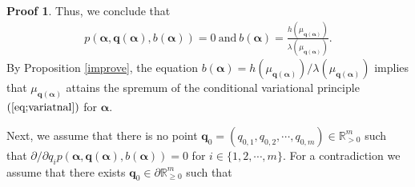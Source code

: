\documentclass{article}
\theoremstyle{definition}
\newtheorem*{pf}{Proof}
\begin{document}
\begin{pf}
Thus, we conclude that 
\begin{align}\label{eq:attain measure}
p(\boldsymbol{\alpha},\boldsymbol{q}(\boldsymbol{\alpha}),b(\boldsymbol{\alpha}))=0\ \text{and}\  b(\boldsymbol{\alpha})=\frac{h(\mu_{\boldsymbol{q}(\boldsymbol{\alpha})})}{\lambda(\mu_{\boldsymbol{q}(\boldsymbol{\alpha})})}.
\end{align}
By Proposition \ref{improve}, the equation $b(\boldsymbol{\alpha})={h(\mu_{\boldsymbol{q}(\boldsymbol{\alpha})})}/{\lambda(\mu_{\boldsymbol{q}(\boldsymbol{\alpha})})}$ implies that $\mu_{\boldsymbol{q}(\boldsymbol{\alpha})}$ attains the spremum of the conditional variational principle $(\ref{eq;variatnal})$ for $\boldsymbol{\alpha}$.

Next, we assume that there is no point $\boldsymbol{q}_0=(q_{0,1},q_{0,2},\cdots,q_{0,m}) \in \mathbb{R}^m_{>0}$ such that
     ${\partial}/{\partial q_i}p(\boldsymbol{\alpha},\boldsymbol{q}(\boldsymbol{\alpha}),b(\boldsymbol{\alpha}))=0$
for $i\in\lbrace1,2,\cdots,m\rbrace$.
For a contradiction we assume that there exists $\boldsymbol{q}_0\in\partial\mathbb{R}_{\geq 0}^m$ such that 

\end{pf}
\end{document}
